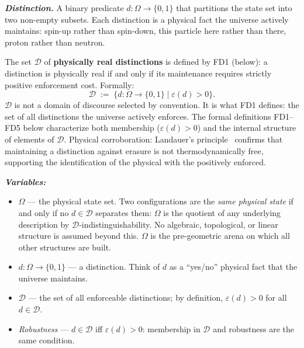 \documentclass[11pt]{article}
\theoremstyle{remark}
\newenvironment{varlist}{\begin{itemize}[nosep,leftmargin=2em]}{\end{itemize}}
\begin{document}
\begin{tcolorbox}[defbox, title={Definitions (Distinction, Enforcement Cost, Interface, Admissible State, Capacity)}]
\textbf{\textit{Distinction.}} A binary predicate $d: \Omega \to \{0, 1\}$ that partitions the state set into two non-empty subsets.  Each distinction is a physical fact the universe actively maintains: spin-up rather than spin-down, this particle here rather than there, proton rather than neutron.

\smallskip\noindent
The set $\mathcal{D}$ of \textbf{physically real distinctions} is defined by FD1 (below): a distinction is physically real if and only if its maintenance requires strictly positive enforcement cost.  Formally:
\[
\mathcal{D} \;:=\; \{d : \Omega \to \{0,1\} \mid \varepsilon(d) > 0\}.
\]
$\mathcal{D}$ is not a domain of discourse selected by convention.  It is what FD1 defines: the set of all distinctions the universe actively enforces.  The formal definitions FD1--FD5 below characterize both membership ($\varepsilon(d) > 0$) and the internal structure of elements of $\mathcal{D}$.  Physical corroboration: Landauer's principle~\cite{Landauer1961} confirms that maintaining a distinction against erasure is not thermodynamically free, supporting the identification of the physical with the positively enforced.

\smallskip\noindent\textbf{\textit{Variables:}}
\begin{varlist}
\item $\Omega$ --- the physical state set.  Two configurations are the \emph{same physical state} if and only if no $d \in \mathcal{D}$ separates them: $\Omega$ is the quotient of any underlying description by $\mathcal{D}$-indistinguishability.  No algebraic, topological, or linear structure is assumed beyond this.  $\Omega$ is the pre-geometric arena on which all other structures are built.
\item $d: \Omega \to \{0,1\}$ --- a distinction.  Think of $d$ as a ``yes/no'' physical fact that the universe maintains.
\item $\mathcal{D}$ --- the set of all enforceable distinctions; by definition, $\varepsilon(d) > 0$ for all $d \in \mathcal{D}$.
\item \textit{Robustness} --- $d \in \mathcal{D}$ iff $\varepsilon(d) > 0$: membership in $\mathcal{D}$ and robustness are the same condition.
\end{varlist}

\end{tcolorbox}
\end{document}
